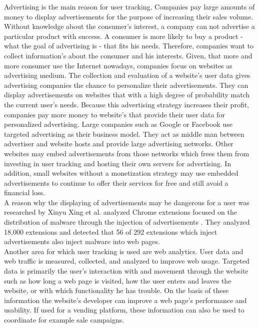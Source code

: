 			Advertising is the main reason for user tracking. Companies pay large amounts of money to display advertisements for the purpose of increasing their sales volume. Without knowledge about the consumer's interest, a company can not advertise a particular product with success. A consumer is more likely to buy a product - what the goal of advertising is - that fits his needs. Therefore, companies want to collect information's about the consumer and his interests. Given, that more and more consumer use the Internet nowadays, companies focus on websites as advertising medium. The collection and evaluation of a website's user data gives advertising companies the chance to personalize their advertisements. They can display advertisements on websites that with a high degree of probability match the current user's needs. Because this advertising strategy increases their profit, companies pay more money to website's that provide their user data for personalized advertising. Large companies such as Google or Facebook use targeted advertising as their business model. They act as middle man between advertiser and website hosts and provide large advertising networks. Other websites may embed advertisements from those networks which frees them from investing in user tracking and hosting their own servers for advertising. In addition, small websites without a monetization strategy may use embedded advertisements to continue to offer their services for free and still avoid a financial loss. \\
			
			A reason why the displaying of advertisements may be dangerous for a user was researched by Xinyu Xing et al. analyzed Chrome extensions focused on the distribution of malware through the injection of advertisements \cite{Xing:2015:UMT:2736277.2741630}. They analyzed 18,000 extensions and detected that 56 of 292 extensions which inject advertisements also inject malware into web pages. %
			\\
			
			Another area for which user tracking is used are web analytics. User data and web traffic is measured, collected, and analyzed to improve web usage. Targeted data is primarily the user's interaction with and movement through the website such as how long a web page is visited, how the user enters and leaves the website, or with which functionality he has trouble. On the basis of these information the website's developer can improve a web page's performance and usability. If used for a vending platform, these information can also be used to coordinate for example sale campaigns. \\
			
